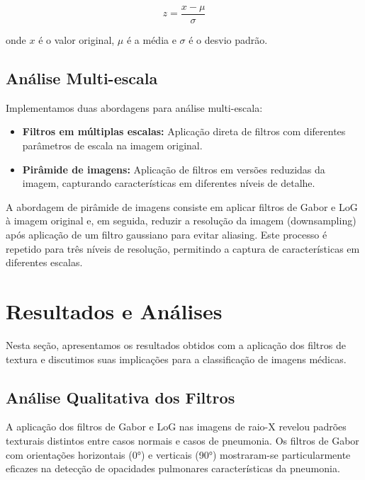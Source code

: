 \documentclass[sigconf,nonacm]{acmart}
\begin{document}
\[
z = \frac{x - \mu}{\sigma}
\]

onde \(x\) é o valor original, \(\mu\) é a média e \(\sigma\) é o desvio padrão.

\subsection{Análise Multi-escala}

Implementamos duas abordagens para análise multi-escala:

\begin{itemize}
  \item \textbf{Filtros em múltiplas escalas:} Aplicação direta de filtros com diferentes parâmetros de escala na imagem original.
  \item \textbf{Pirâmide de imagens:} Aplicação de filtros em versões reduzidas da imagem, capturando características em diferentes níveis de detalhe.
\end{itemize}

A abordagem de pirâmide de imagens consiste em aplicar filtros de Gabor e LoG à imagem original e, em seguida, reduzir a resolução da imagem (downsampling) após aplicação de um filtro gaussiano para evitar aliasing. Este processo é repetido para três níveis de resolução, permitindo a captura de características em diferentes escalas.

\section{Resultados e Análises}

Nesta seção, apresentamos os resultados obtidos com a aplicação dos filtros de textura e discutimos suas implicações para a classificação de imagens médicas.

\subsection{Análise Qualitativa dos Filtros}

A aplicação dos filtros de Gabor e LoG nas imagens de raio-X revelou padrões texturais distintos entre casos normais e casos de pneumonia. Os filtros de Gabor com orientações horizontais (0°) e verticais (90°) mostraram-se particularmente eficazes na detecção de opacidades pulmonares características da pneumonia.
\end{document}
